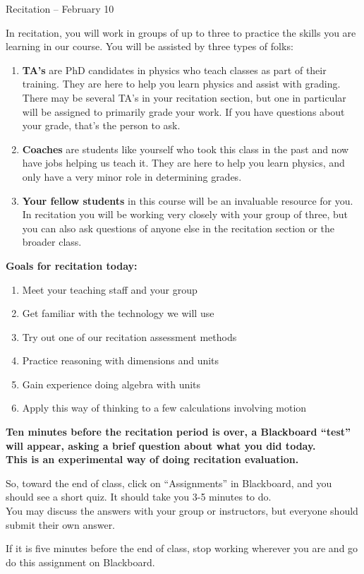 \documentclass[12pt]{article}
\newcommand{\BE}{\begin{enumerate}}
\newcommand{\EE}{\end{enumerate}}
\begin{document}
	\begin{center}\sc \Large Recitation -- February 10 \end{center}
	
	In recitation, you will work in groups of up to three to practice the skills you are learning in our course. You will be assisted by three types of folks:
	
	\BE
	\item {\bf TA's} are PhD candidates in physics who teach classes as part of their training. They are here to help you learn physics and assist with grading. There may be several TA's in your recitation section, but one in particular will be assigned to primarily grade your work. If you have questions about your grade, that's the person to ask.
	
	\item {\bf Coaches} are students like yourself who took this class in the past and now have jobs helping us teach it. They are here to help you learn physics, and only have a very minor role in determining grades.
	
	\item {\bf Your fellow students} in this course will be an invaluable resource for you. In recitation you will be working very closely with your group of three, but you can also ask questions of anyone else in the recitation section or the broader class. 
	\EE
	
\vspace{0.5in}
	
	{\bf Goals for recitation today:}
	
	
	\BE
	\item Meet your teaching staff and your group
	\item Get familiar with the technology we will use
	\item Try out one of our recitation assessment methods
	\item Practice reasoning with dimensions and units
	\item Gain experience doing algebra with units
	\item Apply this way of thinking to a few calculations involving motion
	\EE
	
	\bigskip
	
	\begin{center}
		\bfseries
		Ten minutes before the recitation period is over, a Blackboard ``test'' will appear, asking a brief question about what you did today.\\ This is an experimental way of doing recitation evaluation.
		
		So, toward the end of class, click on ``Assignments'' in Blackboard, and you should see a short quiz. It should take you 3-5 minutes to do. \\You may discuss the answers with your group or instructors, but everyone should submit their own answer.
		
		If it is five minutes before the end of class, stop working wherever you are and go do this assignment on Blackboard.
	\end{center}
\end{document}
